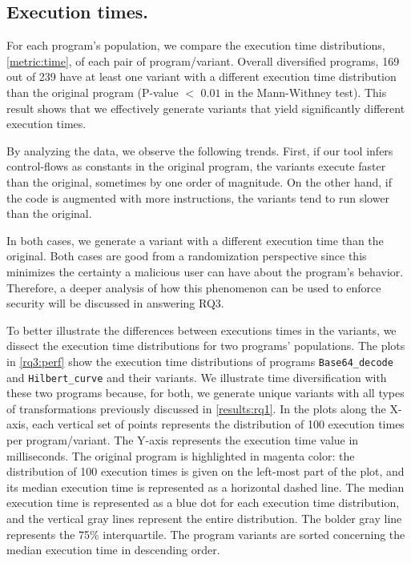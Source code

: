 \subsection*{Execution times.}

For each program's population, we compare the execution time distributions, \autoref{metric:time}, of each pair of program/variant.
Overall diversified programs, 169 out of 239 have at least one variant with a different execution time distribution than the original program (P-value $<$ $0.01$ in the Mann-Withney test). This result shows that we effectively generate variants that yield significantly different execution times.

By analyzing the data, we observe the following trends. First, if our tool infers control-flows as constants in the original program, the variants execute faster than the original, sometimes by one order of magnitude. On the other hand, if the code is augmented with more instructions, the variants tend to run slower than the original. 

In both cases, we generate a variant with a different execution time than the original. Both cases are good from a randomization perspective since this minimizes the certainty a malicious user can have about the program's behavior. Therefore, a deeper analysis of how this phenomenon can be used to enforce security will be discussed in answering RQ3.

To better illustrate the differences between executions times in the variants, we dissect the execution time distributions for two programs' populations. 
The plots in \autoref{rq3:perf} show the execution time distributions of programs \texttt{Base64\_decode} and \texttt{Hilbert\_curve} and their variants. 
We illustrate time diversification with these two programs because, for both, we generate unique variants with all types of transformations previously discussed in \autoref{results:rq1}.
In the plots along the X-axis, each vertical set of points represents the distribution of 100 execution times per program/variant. The Y-axis represents the execution time value in milliseconds. The original program is highlighted in magenta color: the distribution of 100 execution times is given on the left-most part of the plot, and its median execution time is represented as a horizontal dashed line. The median execution time is represented as a blue dot for each execution time distribution, and the vertical gray lines represent the entire distribution. The bolder gray line represents the 75\% interquartile. The program variants are sorted concerning the median execution time in descending order.



